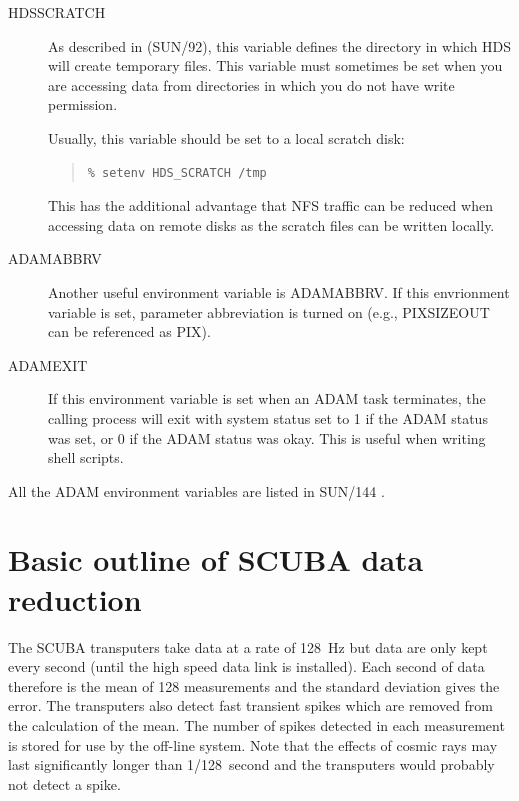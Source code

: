 \documentclass[twoside,11pt]{article}
\newenvironment{myquote}{\begin{quote}\begin{small}}{\end{small}\end{quote}}
\newcommand{\xref}[3]{#1}
\newcommand{\xlabel}[1]{}
\renewcommand{\_}{\texttt{\symbol{95}}}
\begin{document}
\begin{description}
\item[HDS\_SCRATCH] \mbox{}

As described in
\xref{(SUN/92)}{sun92}{scratch_files}, this variable defines the directory in
which HDS will create temporary files. This variable must sometimes be set
when you are accessing data from directories in which you do not have write
permission.

Usually, this variable should be set to a local scratch disk:
\begin{myquote}
\begin{verbatim}
% setenv HDS_SCRATCH /tmp
\end{verbatim}
\end{myquote}
This has the additional advantage that NFS traffic can be reduced when
accessing data on remote disks as the scratch files can be written locally.

\item[ADAM\_ABBRV] \mbox{}

Another useful environment variable is 
\xref{ADAM\_ABBRV}{sun95}{se_parabbrev}. If this envrionment
variable is set, parameter abbreviation is turned on (e.g., PIXSIZE\_OUT
can be referenced as PIX).

\item[ADAM\_EXIT] \mbox{}

If this environment variable is set when an ADAM task terminates, the calling
process will exit with system status set to 1 if the ADAM status was set, or 0
if the ADAM status was okay. This is useful when writing shell scripts.

\end{description}

All the ADAM environment variables are listed in
\xref{SUN/144}{sun144}{ADAM_environment_variables} \cite{adam}.

\section{\xlabel{outline}Basic outline of SCUBA data reduction\label{outline}}

The SCUBA transputers take data at a rate of 128~Hz but data are only kept
every second (until the high speed data link is installed). Each second of
data therefore is the mean of 128 measurements and the standard deviation
gives the error. The transputers also detect fast transient spikes which are
removed from the calculation of the mean. The number of spikes detected in
each measurement is stored for use by the off-line system. Note that the
effects of cosmic rays may last significantly longer than 1/128~second and the
transputers would probably not detect a spike.
\end{document}
